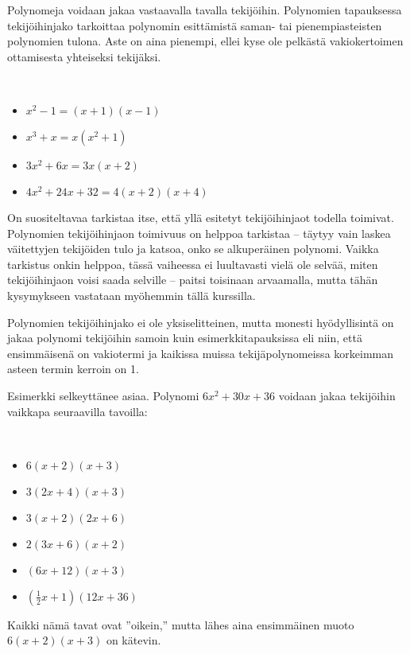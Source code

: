 Polynomeja voidaan jakaa vastaavalla tavalla tekijöihin. Polynomien tapauksessa tekijöihinjako tarkoittaa
polynomin esittämistä saman- tai pienempiasteisten polynomien tulona. Aste on aina pienempi, ellei kyse ole pelkästä
vakiokertoimen ottamisesta yhteiseksi tekijäksi.

\begin{esimerkki}
\qquad \\
\begin{itemize}
    \item $x^2-1 = (x+1)(x-1)$
    \item $x^3+x = x(x^2+1)$
    \item $3x^2+6x = 3x(x+2)$
    \item $4x^2+24x+32 = 4(x+2)(x+4)$
\end{itemize}
\end{esimerkki}

On suositeltavaa tarkistaa itse, että yllä esitetyt tekijöihinjaot todella toimivat. Polynomien tekijöihinjaon toimivuus
on helppoa tarkistaa -- täytyy vain laskea väitettyjen tekijöiden tulo ja katsoa, onko se alkuperäinen polynomi. Vaikka
tarkistus onkin helppoa, tässä vaiheessa ei luultavasti vielä ole selvää, miten tekijöihinjaon voisi saada selville
-- paitsi toisinaan arvaamalla, mutta tähän kysymykseen vastataan myöhemmin tällä kurssilla.

Polynomien tekijöihinjako ei ole yksiselitteinen, mutta monesti hyödyllisintä on jakaa polynomi tekijöihin samoin kuin
esimerkkitapauksissa eli niin, että ensimmäisenä on vakiotermi ja kaikissa muissa tekijäpolynomeissa korkeimman asteen
termin kerroin on 1.

Esimerkki selkeyttänee asiaa. Polynomi $6x^2+30x+36$ voidaan jakaa tekijöihin vaikkapa seuraavilla tavoilla:

\begin{esimerkki}
\qquad \\
\begin{itemize}
    \item $6(x+2)(x+3)$
    \item $3(2x+4)(x+3)$
    \item $3(x+2)(2x+6)$
    \item $2(3x+6)(x+2)$
    \item $(6x+12)(x+3)$
    \item $(\frac12 x+1)(12x+36)$
\end{itemize}
\end{esimerkki}

Kaikki nämä tavat ovat ''oikein,'' mutta lähes aina ensimmäinen muoto $6(x+2)(x+3)$ on kätevin.

